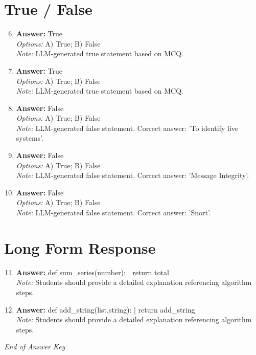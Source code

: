 \documentclass[12pt]{article}
\begin{document}
\section*{True / False}
\begin{enumerate}[label=\arabic*.]
\setcounter{enumi}{5}
\item \textbf{Answer:} True
\\ \textit{Options:} A) True; B) False
\\ \textit{Note:} LLM-generated true statement based on MCQ.
\item \textbf{Answer:} True
\\ \textit{Options:} A) True; B) False
\\ \textit{Note:} LLM-generated true statement based on MCQ.
\item \textbf{Answer:} False
\\ \textit{Options:} A) True; B) False
\\ \textit{Note:} LLM-generated false statement. Correct answer: 'To identify live systems'.
\item \textbf{Answer:} False
\\ \textit{Options:} A) True; B) False
\\ \textit{Note:} LLM-generated false statement. Correct answer: 'Message Integrity'.
\item \textbf{Answer:} False
\\ \textit{Options:} A) True; B) False
\\ \textit{Note:} LLM-generated false statement. Correct answer: 'Snort'.
\end{enumerate}

\section*{Long Form Response}
\begin{enumerate}[label=\arabic*.]
\setcounter{enumi}{10}
\item \textbf{Answer:} def sum\_series(number): | return total
\\ \textit{Note:} Students should provide a detailed explanation referencing algorithm steps.
\item \textbf{Answer:} def add\_string(list,string): | return add\_string
\\ \textit{Note:} Students should provide a detailed explanation referencing algorithm steps.
\end{enumerate}

\vfill
\noindent\textit{End of Answer Key}
\end{document}
